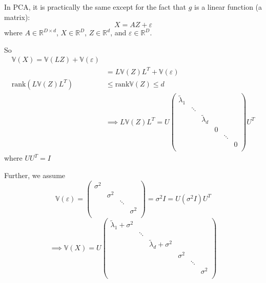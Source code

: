 \documentclass[12pt]{article}
\newcommand{\R}{\mathbb{R}}
\begin{document}
        In PCA, it is practically the same except for the fact that $g$ is a linear function (a matrix):
        \[X = AZ + \varepsilon\]
        where $A \in \R^{D \times d}$, $X \in \R^D$, $Z \in \R^d$, and $\varepsilon \in \R^D$.

        So 
        \begin{align*}
            \mathbb{V}(X) = \mathbb{V}(LZ) + \mathbb{V}(\varepsilon)\\ 
                &= L \mathbb{V}(Z) L^T + \mathbb{V}(\varepsilon)\\ 
            \text{rank}(L \mathbb{V}(Z) L^T) &\leq \text{rank} \mathbb{V}(Z) \leq d\\ 
                &\implies L\mathbb{V}(Z) L^T = U\begin{pmatrix}
                    \tilde{\lambda}_1 & & & &\\ 
                    & \ddots & & & &\\
                    & & \tilde{\lambda}_d & & &\\
                    & & & 0 & & \\ 
                    & & & & \ddots & \\
                    & & & & & 0 \\
                \end{pmatrix} U^T
        \end{align*}
        where $UU^T = I$ 

        Further, we assume 
        \[\mathbb{V}(\varepsilon) = \begin{pmatrix}
            \sigma^2 & & &\\
            & \sigma^2 & &\\
            & & \ddots &\\
            & & & \sigma^2\\
        \end{pmatrix} = \sigma^2 I = U(\sigma^2 I)U^T\]
        \[\implies \mathbb{V}(X) =U\begin{pmatrix}
            \tilde{\lambda}_1 + \sigma^2 & & & &\\ 
            & \ddots & & & &\\
            & & \tilde{\lambda}_d + \sigma^2 & & &\\
            & & & \sigma^2& & \\ 
            & & & & \ddots & \\
            & & & & & \sigma^2 \\
        \end{pmatrix} \]
\end{document}
